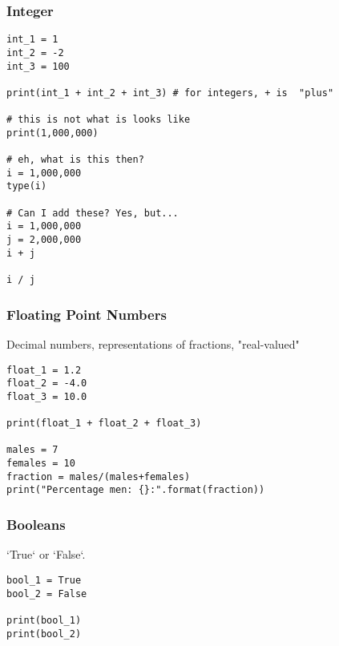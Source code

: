 \begin{frame}[fragile]\frametitle{Integer}
\begin{lstlisting}
int_1 = 1
int_2 = -2
int_3 = 100

print(int_1 + int_2 + int_3) # for integers, + is  "plus"

# this is not what is looks like
print(1,000,000)

# eh, what is this then?
i = 1,000,000
type(i)

# Can I add these? Yes, but...
i = 1,000,000
j = 2,000,000
i + j

i / j
\end{lstlisting}
\end{frame}

\begin{frame}[fragile]\frametitle{Floating Point Numbers}
Decimal numbers, representations of fractions, "real-valued"
\begin{lstlisting}
float_1 = 1.2
float_2 = -4.0
float_3 = 10.0

print(float_1 + float_2 + float_3)

males = 7
females = 10
fraction = males/(males+females)
print("Percentage men: {}:".format(fraction))
\end{lstlisting}
\end{frame}

\begin{frame}[fragile]\frametitle{Booleans}
`True` or `False`.
\begin{lstlisting}
bool_1 = True 
bool_2 = False

print(bool_1)
print(bool_2)
\end{lstlisting}
\end{frame}


